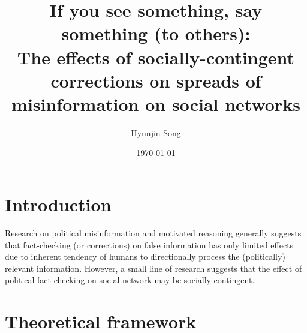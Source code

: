 \documentclass[12pt]{article}
\title{\vspace{.5cm }
  \LARGE{If you see something, say something (to others):} \\
  \large{The effects of socially-contingent corrections on spreads of misinformation on social networks}
  }
\author{Hyunjin Song}
\date{\today}
\begin{document}
\maketitle

\section{Introduction}

Research on political misinformation and motivated reasoning generally suggests that fact-checking (or corrections) on false information has only limited effects due to inherent tendency of humans to directionally process the (politically) relevant information. However, a small line of research suggests that the effect of political fact-checking on social network may be socially contingent.

\section{Theoretical framework}
\end{document}
